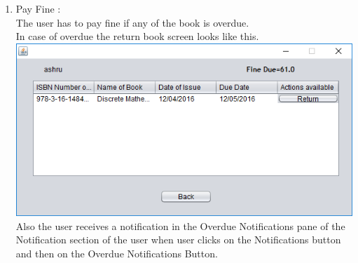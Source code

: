 \documentclass{article}
\begin{document}
\begin{enumerate}
	\item Pay Fine :\\
	The user has to pay fine if any of the book is overdue.\\
	In case of overdue the return book screen looks like this.\\
	\includegraphics[scale=0.8]{images/UserLogin/Actions/OverdueBookFine.PNG}\\
	
	Also the user receives a notification in the Overdue Notifications pane of the Notification section of the user when user clicks on the Notifications button and then on the Overdue Notifications Button.
	

\end{enumerate}
\end{document}
